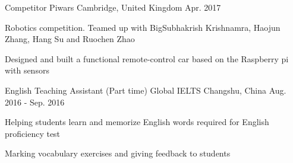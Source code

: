\begin{cventries}
    \cventry
    {Competitor} %
    {Piwars} %
    {Cambridge, United Kingdom} %
    {Apr. 2017} %
    {
      \begin{cvitems} %
        \item {Robotics competition. Teamed up with BigSubhakrish Krishnamra, Haojun Zhang, Hang Su and Ruochen Zhao}
        \item {Designed and built a functional remote-control car based on the Raspberry pi with sensors}
      \end{cvitems}
    }

  \cventry
    {English Teaching Assistant (Part time)} %
    {Global IELTS} %
    {Changshu, China} %
    {Aug. 2016 - Sep. 2016} %
    {
      \begin{cvitems} %
        \item {Helping students learn and memorize English words required for English proficiency test}
		\item {Marking vocabulary exercises and giving feedback to students}
      \end{cvitems}
    }
    
\end{cventries}
